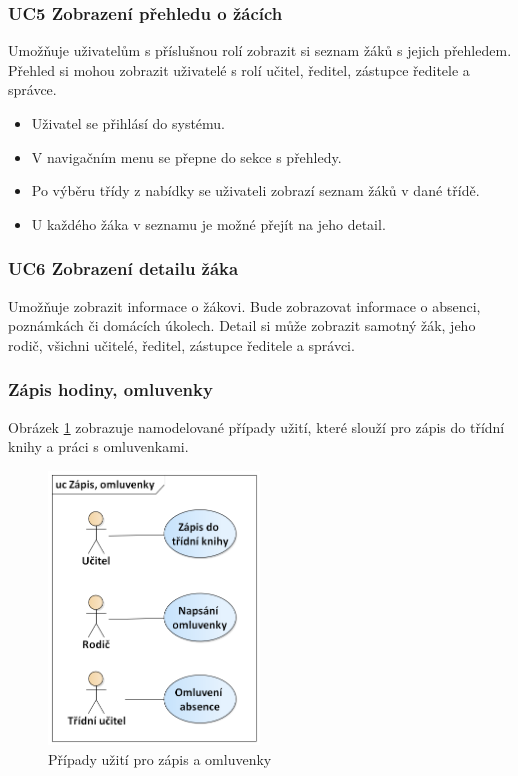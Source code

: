 \subsubsection*{UC5 Zobrazení přehledu o žácích}
Umožňuje uživatelům s příslušnou rolí zobrazit si seznam žáků s jejich přehledem. Přehled si mohou zobrazit uživatelé s rolí učitel, ředitel, zástupce ředitele a správce.
\begin{itemize}
    \item Uživatel se přihlásí do systému.
    \item V navigačním menu se přepne do sekce s přehledy.
    \item Po výběru třídy z nabídky se uživateli zobrazí seznam žáků v dané třídě.
    \item U každého žáka v seznamu je možné přejít na jeho detail.
\end{itemize}

\subsubsection*{UC6 Zobrazení detailu žáka}
Umožňuje zobrazit informace o žákovi. Bude zobrazovat informace o absenci, poznámkách či domácích úkolech. Detail si může zobrazit samotný žák, jeho rodič, všichni učitelé, ředitel, zástupce ředitele a správci.


\subsubsection{Zápis hodiny, omluvenky}
Obrázek \ref{pripady-zapis} zobrazuje namodelované případy užití, které slouží pro zápis do třídní knihy a práci s omluvenkami.


\begin{figure}[h]
	\centering
	\includegraphics[width=0.5\textwidth]{images/zapis.png}
	\caption{Případy užití pro zápis a omluvenky}
	\label{pripady-zapis}
\end{figure}

